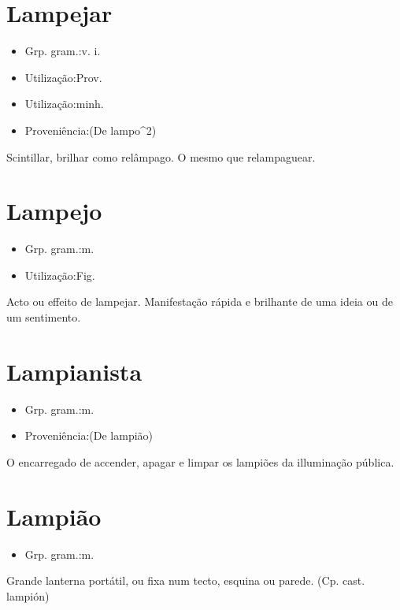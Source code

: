 \section{Lampejar}
\begin{itemize}
\item {Grp. gram.:v. i.}
\end{itemize}
\begin{itemize}
\item {Utilização:Prov.}
\end{itemize}
\begin{itemize}
\item {Utilização:minh.}
\end{itemize}
\begin{itemize}
\item {Proveniência:(De \textunderscore lampo\textunderscore ^2)}
\end{itemize}
Scintillar, brilhar como relâmpago.
O mesmo que \textunderscore relampaguear\textunderscore .
\section{Lampejo}
\begin{itemize}
\item {Grp. gram.:m.}
\end{itemize}
\begin{itemize}
\item {Utilização:Fig.}
\end{itemize}
Acto ou effeito de lampejar.
Manifestação rápida e brilhante de uma ideia ou de um sentimento.
\section{Lampianista}
\begin{itemize}
\item {Grp. gram.:m.}
\end{itemize}
\begin{itemize}
\item {Proveniência:(De \textunderscore lampião\textunderscore )}
\end{itemize}
O encarregado de accender, apagar e limpar os lampiões da illuminação pública.
\section{Lampião}
\begin{itemize}
\item {Grp. gram.:m.}
\end{itemize}
Grande lanterna portátil, ou fixa num tecto, esquina ou parede.
(Cp. cast. \textunderscore lampión\textunderscore )

